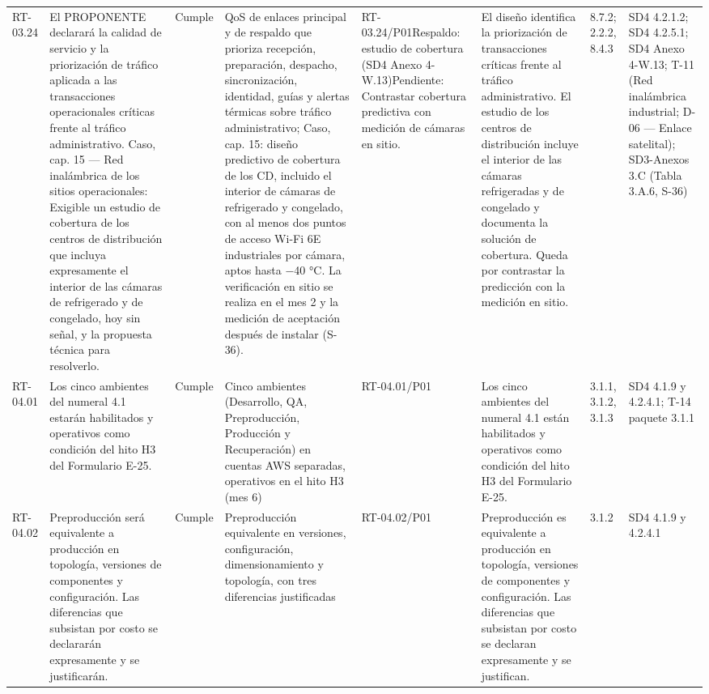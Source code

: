 \documentclass[oficio,firma,final]{lafrox}
\begin{document}
\begin{landscape}
{\begin{longtable}{@{}F{0.054} F{0.173} F{0.061} F{0.191} F{0.106} F{0.180} F{0.067} F{0.168}@{}}
  RT-03.24 & El PROPONENTE declarará la calidad de servicio y la priorización de tráfico aplicada a las transacciones operacionales críticas frente al tráfico administrativo. Caso, cap. 15 — Red inalámbrica de los sitios operacionales: Exigible un estudio de cobertura de los centros de distribución que incluya expresamente el interior de las cámaras de refrigerado y de congelado, hoy sin señal, y la propuesta técnica para resolverlo. & Cumple & QoS de enlaces principal y de respaldo que prioriza recepción, preparación, despacho, sincronización, identidad, guías y alertas térmicas sobre tráfico administrativo; Caso, cap. 15: diseño predictivo de cobertura de los CD, incluido el interior de cámaras de refrigerado y congelado, con al menos dos puntos de acceso Wi-Fi 6E industriales por cámara, aptos hasta $-$40 °C. La verificación en sitio se realiza en el mes 2 y la medición de aceptación después de instalar (S-36). & RT-03.24/\allowbreak{}P01\newline Respaldo: estudio de cobertura (SD4 Anexo 4-W.13)\newline Pendiente: Contrastar cobertura predictiva con medición de cámaras en sitio. & El diseño identifica la priorización de transacciones críticas frente al tráfico administrativo. El estudio de los centros de distribución incluye el interior de las cámaras refrigeradas y de congelado y documenta la solución de cobertura. Queda por contrastar la predicción con la medición en sitio. & 8.7.2; 2.2.2, 8.4.3 & SD4 4.2.1.2; SD4 4.2.5.1; SD4 Anexo 4-W.13; T-11 (Red inalámbrica industrial; D-06 — Enlace satelital); SD3-Anexos 3.C (Tabla 3.A.6, S-36)  \\
  RT-04.01 & Los cinco ambientes del numeral 4.1 estarán habilitados y operativos como condición del hito H3 del Formulario E-25. & Cumple & Cinco ambientes (Desarrollo, QA, Preproducción, Producción y Recuperación) en cuentas AWS separadas, operativos en el hito H3 (mes 6) & RT-04.01/\allowbreak{}P01 & Los cinco ambientes del numeral 4.1 están habilitados y operativos como condición del hito H3 del Formulario E-25. & 3.1.1, 3.1.2, 3.1.3 & SD4 4.1.9 y 4.2.4.1; T-14 paquete 3.1.1  \\
  RT-04.02 & Preproducción será equivalente a producción en topología, versiones de componentes y configuración. Las diferencias que subsistan por costo se declararán expresamente y se justificarán. & Cumple & Preproducción equivalente en versiones, configuración, dimensionamiento y topología, con tres diferencias justificadas & RT-04.02/\allowbreak{}P01 & Preproducción es equivalente a producción en topología, versiones de componentes y configuración. Las diferencias que subsistan por costo se declaran expresamente y se justifican. & 3.1.2 & SD4 4.1.9 y 4.2.4.1  \\

\end{longtable}}
\end{landscape}
\end{document}
